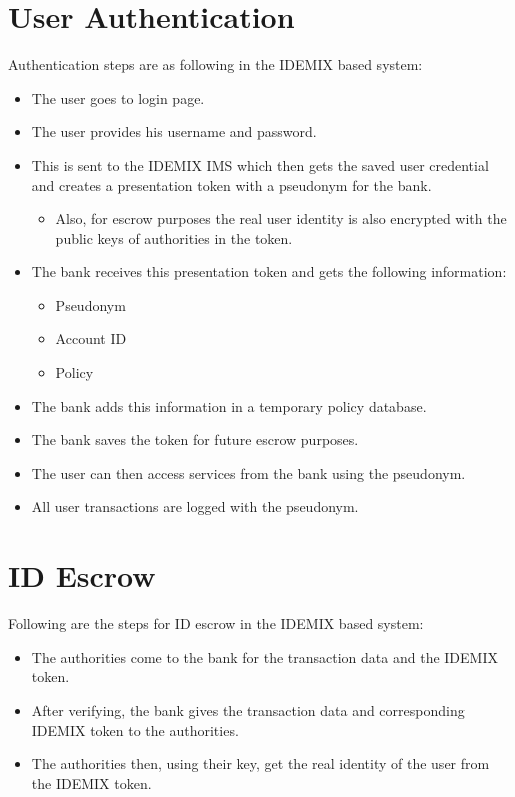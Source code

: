 \section{User Authentication}
Authentication steps are as following in the IDEMIX based system:
\begin{itemize}
	\item The user goes to login page.
	\item The user provides his username and password.
	\item This is sent to the IDEMIX IMS which then gets the saved user credential and creates a presentation token with a pseudonym for the bank.
	\begin{itemize}
		\item Also, for escrow purposes the real user identity is also encrypted with the public keys of authorities in the token.
	\end{itemize}
	\item The bank receives this presentation token and gets the following information:
	\begin{itemize}
		\item Pseudonym
		\item Account ID
		\item Policy
	\end{itemize}
	\item The bank adds this information in a temporary policy database.
	\item The bank saves the token for future escrow purposes.
	\item The user can then access services from the bank using the pseudonym.
	\item All user transactions are logged with the pseudonym.
\end{itemize}
\section{ID Escrow}
Following are the steps for ID escrow in the IDEMIX based system:
\begin{itemize}
	\item The authorities come to the bank for the transaction data and the IDEMIX token.
	\item After verifying, the bank gives the transaction data and corresponding IDEMIX token to the authorities.
	\item The authorities then, using their key, get the real identity of the user from the IDEMIX token.
\end{itemize}

